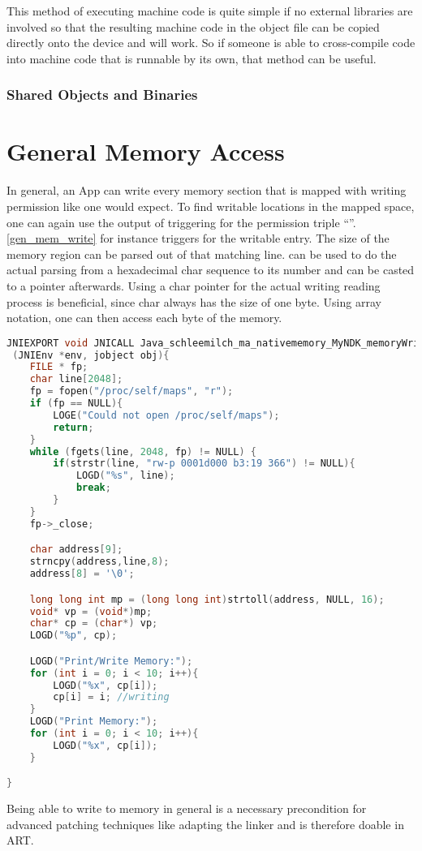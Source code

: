 This method of executing machine code is quite simple if no external libraries are involved so that the resulting machine code in the object file can be copied directly
onto the device and will work. 
So if someone is able to cross-compile code into machine code that is runnable by its own, that method can be useful.


\subsubsection{Shared Objects and Binaries}

\section{General Memory Access}\label{section:general_mem_access}
In general, an App can write every memory section that is mapped with writing permission
like one would expect. To find writable locations in the mapped space, one can again
use the output of  triggering for the permission triple 
``''. \autoref{gen_mem_write} for instance triggers for the writable
 entry. The size of the memory region can be parsed out 
of that matching line.  can be used to do the actual parsing from a 
hexadecimal char sequence to its  number and can be casted to 
a pointer afterwards. Using a char pointer for the actual writing reading process 
is beneficial, since char always has the size of one byte. Using array notation, one 
can then access each byte of the memory. 
\begin{lstlisting}[language=C++, caption=memoryWriting(), label=gen_mem_write]
JNIEXPORT void JNICALL Java_schleemilch_ma_nativememory_MyNDK_memoryWriting 
 (JNIEnv *env, jobject obj){
    FILE * fp;
    char line[2048];
    fp = fopen("/proc/self/maps", "r");
    if (fp == NULL){
        LOGE("Could not open /proc/self/maps");
        return;
    }
    while (fgets(line, 2048, fp) != NULL) {
        if(strstr(line, "rw-p 0001d000 b3:19 366") != NULL){
            LOGD("%s", line);
            break;
        }
    }
    fp->_close;

    char address[9];
    strncpy(address,line,8);
    address[8] = '\0';

    long long int mp = (long long int)strtoll(address, NULL, 16);
    void* vp = (void*)mp;
    char* cp = (char*) vp;
    LOGD("%p", cp);

    LOGD("Print/Write Memory:");
    for (int i = 0; i < 10; i++){
        LOGD("%x", cp[i]);
        cp[i] = i; //writing
    }
    LOGD("Print Memory:");
    for (int i = 0; i < 10; i++){
        LOGD("%x", cp[i]);
    }

}
\end{lstlisting}
Being able to write to memory in general is a necessary precondition for advanced patching techniques like adapting the linker and is therefore doable in ART.
